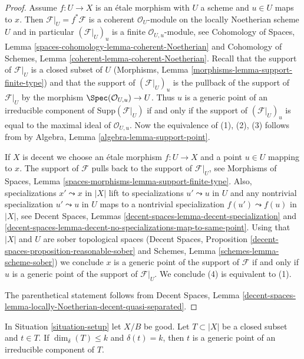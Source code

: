 \begin{proof}
Assume $f : U \to X$ is an \'etale morphism with $U$ a scheme
and $u \in U$ maps to $x$. Then $\mathcal{F}|_U = f^*\mathcal{F}$
is a coherent $\mathcal{O}_U$-module on the locally Noetherian
scheme $U$ and in particular $(\mathcal{F}|_U)_u$ is a finite
$\mathcal{O}_{U, u}$-module, see Cohomology of Spaces, Lemma
\ref{spaces-cohomology-lemma-coherent-Noetherian}
and Cohomology of Schemes, Lemma
\ref{coherent-lemma-coherent-Noetherian}.
Recall that the support of $\mathcal{F}|_U$ is a closed subset of $U$
(Morphisms, Lemma \ref{morphisms-lemma-support-finite-type}) and
that the support of $(\mathcal{F}|_U)_u$ is the pullback
of the support of $\mathcal{F}|_U$ by the morphism
$\Spec(\mathcal{O}_{U, u}) \to U$. Thus $u$ is a generic point
of an irreducible component of $\text{Supp}(\mathcal{F}|_U)$
if and only if the support of $(\mathcal{F}|_U)_u$ is equal
to the maximal ideal of $\mathcal{O}_{U, u}$.
Now the equivalence of (1), (2), (3) follows from
by Algebra, Lemma \ref{algebra-lemma-support-point}.

\medskip\noindent
If $X$ is decent we choose an \'etale morphism $f : U \to X$ and a point
$u \in U$ mapping to $x$. The support of $\mathcal{F}$ pulls back to
the support of $\mathcal{F}|_U$, see
Morphisms of Spaces, Lemma \ref{spaces-morphisms-lemma-support-finite-type}.
Also, specializations $x' \leadsto x$ in $|X|$ lift to specializations
$u' \leadsto u$ in $U$ and any nontrivial specialization $u' \leadsto u$ in $U$
maps to a nontrivial specialization $f(u') \leadsto f(u)$ in $|X|$, see
Decent Spaces, Lemmas
\ref{decent-spaces-lemma-decent-specialization} and
\ref{decent-spaces-lemma-decent-no-specializations-map-to-same-point}.
Using that $|X|$ and $U$ are sober topological spaces
(Decent Spaces, Proposition \ref{decent-spaces-proposition-reasonable-sober}
and
Schemes, Lemma \ref{schemes-lemma-scheme-sober}) we conclude
$x$ is a generic point of the support of $\mathcal{F}$
if and only if $u$ is a generic point of the support of
$\mathcal{F}|_U$. We conclude (4) is equivalent to (1).

\medskip\noindent
The parenthetical statement follows from Decent Spaces, Lemma
\ref{decent-spaces-lemma-locally-Noetherian-decent-quasi-separated}.
\end{proof}

\begin{lemma}
\label{lemma-point-of-max-dimension}
In Situation \ref{situation-setup} let $X/B$ be good.
Let $T \subset |X|$ be a closed subset and $t \in T$.
If $\dim_\delta(T) \leq k$ and $\delta(t) = k$, then
$t$ is a generic point of an irreducible component of $T$.
\end{lemma}

